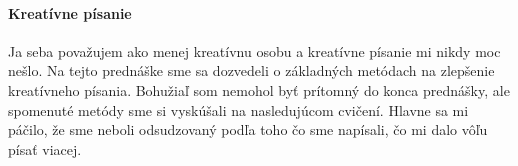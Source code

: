 \documentclass[10pt,oneside,slovak,a4paper,hidelinks]{article}
\begin{document}
		\paragraph{Kreatívne písanie}
			Ja seba považujem ako menej kreatívnu osobu a kreatívne písanie mi nikdy moc nešlo. Na tejto prednáške sme sa dozvedeli o základných metódach na zlepšenie kreatívneho písania. Bohužiaľ som nemohol byť prítomný do konca prednášky, ale spomenuté metódy sme si vyskúšali na nasledujúcom cvičení. Hlavne sa mi páčilo, že sme neboli odsudzovaný podľa toho čo sme napísali, čo mi dalo vôľu písať viacej.	
	
	
	
	
	\pagebreak
	
\end{document}
